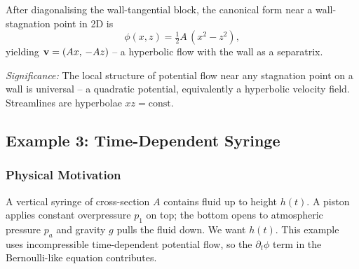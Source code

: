 \documentclass[../main.tex]{subfiles}
\begin{document}
After diagonalising the wall-tangential block, the canonical form near a wall-stagnation point in 2D is
\begin{equation}
  \boxed{\phi(x,z) = \tfrac{1}{2}A\,(x^2 - z^2),}
  \label{eq:lec15_stag_canonical}
\end{equation}
yielding $\mathbf{v} = (Ax,\,-Az)$ -- a hyperbolic flow with the wall as a separatrix.

\textit{Significance:} The local structure of potential flow near any stagnation point on a wall is universal -- a quadratic potential, equivalently a hyperbolic velocity field. Streamlines are hyperbolae $xz=\mathrm{const}$.

\subsection{Example 3: Time-Dependent Syringe}\label{sec:lec15:syringe}

\subsubsection*{Physical Motivation}
A vertical syringe of cross-section $A$ contains fluid up to height $h(t)$. A piston applies constant overpressure $p_1$ on top; the bottom opens to atmospheric pressure $p_a$ and gravity $g$ pulls the fluid down. We want $h(t)$. This example uses incompressible time-dependent potential flow, so the $\partial_t\phi$ term in the Bernoulli-like equation contributes.

\begin{center}
\end{center}
\end{document}
